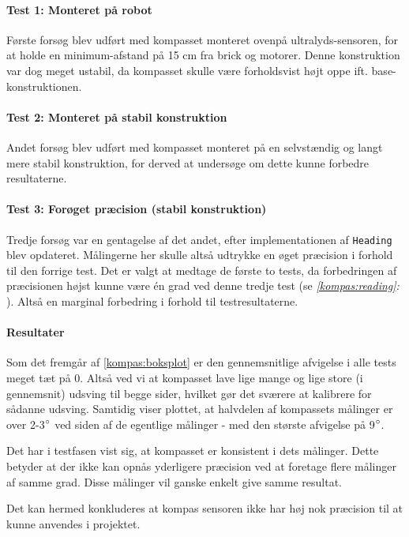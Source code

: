 

\paragraph{Test 1: Monteret på robot}
Første forsøg blev udført med kompasset monteret ovenpå ultralyds-sensoren, for at holde en minimum-afstand på 15 cm fra brick og motorer.
Denne konstruktion var dog meget ustabil, da kompasset skulle være forholdsvist højt oppe ift. base-konstruktionen.

\paragraph{Test 2: Monteret på stabil konstruktion}
Andet forsøg blev udført med kompasset monteret på en selvstændig og langt mere stabil konstruktion, for derved at undersøge om dette kunne forbedre resultaterne.

\paragraph{Test 3: Forøget præcision (stabil konstruktion)}
Tredje forsøg var en gentagelse af det andet, efter implementationen af \lstinline[style=csharp]!Heading! blev opdateret.
Målingerne her skulle altså udtrykke en øget præcision i forhold til den forrige test.
Det er valgt at medtage de første to tests, da forbedringen af præcisionen højst kunne være \'en grad ved denne tredje test (se \textit{\cref{kompas:reading}: }).
Altså en marginal forbedring i forhold til testresultaterne.

\paragraph{Resultater}
Som det fremgår af \cref{kompas:boksplot} er den gennemsnitlige afvigelse i alle tests meget tæt på 0.
Altså ved vi at kompasset lave lige mange og lige store (i gennemsnit) udsving til begge sider, hvilket gør det sværere at kalibrere for sådanne udsving.
Samtidig viser plottet, at halvdelen af kompassets målinger er over 2-3$^\circ$ ved siden af de egentlige målinger - med den største afvigelse på 9$^\circ$.

Det har i testfasen vist sig, at kompasset er konsistent i dets målinger.
Dette betyder at der ikke kan opnås yderligere præcision ved at foretage flere målinger af samme grad.
Disse målinger vil ganske enkelt give samme resultat.

Det kan hermed konkluderes at kompas sensoren ikke har høj nok præcision til at kunne anvendes i projektet.

